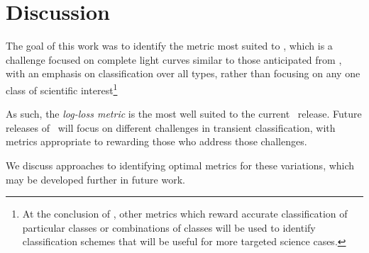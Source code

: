 \section{Discussion}
\label{sec:discussion}
The goal of this work was to identify the metric most suited to \plasticc, which is a challenge focused on complete light curves similar to those anticipated from \lsst, with an emphasis on classification over all types, rather than focusing on any one class of scientific interest\footnote{At the conclusion of \plasticc, other metrics which reward accurate classification of particular classes or combinations of classes will be used to identify classification schemes that will be useful for more targeted science cases.}


As such, the \textit{log-loss metric} is the most well suited to the current \plasticc\ release. Future releases of \plasticc\ will focus on different challenges in transient classification, with metrics appropriate to rewarding those who address those challenges.


We discuss approaches to identifying optimal metrics for these variations, which may be developed further in future work.

